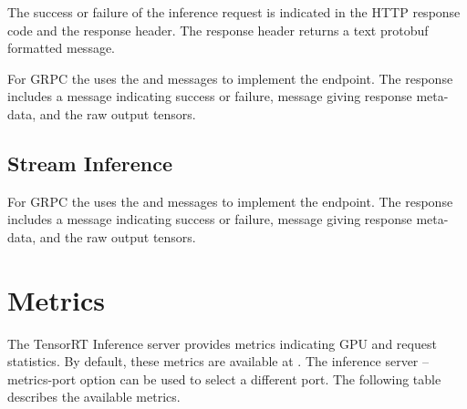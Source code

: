 \documentclass[letterpaper,10pt,english]{sphinxmanual}
\begin{document}
The success or failure of the inference request is indicated in the
HTTP response code and the  response header. The
 response header returns a text protobuf formatted
message.

For GRPC the  uses the
 and
messages to implement the endpoint. The response includes a
message indicating success or failure,  message giving
response meta-data, and the raw output tensors.


\section{Stream Inference}
\label{\detokenize{http_grpc_api:stream-inference}}\label{\detokenize{http_grpc_api:section-api-stream-inference}}
For GRPC the  uses the
 and
messages to implement the endpoint. The response includes a
message indicating success or failure,  message giving
response meta-data, and the raw output tensors.


\chapter{Metrics}
\label{\detokenize{metrics:metrics}}\label{\detokenize{metrics:section-metrics}}\label{\detokenize{metrics::doc}}
The TensorRT Inference server provides  metrics indicating GPU and request
statistics. By default, these metrics are available at
. The inference server --metrics-port
option can be used to select a different port. The following table
describes the available metrics.
\end{document}
